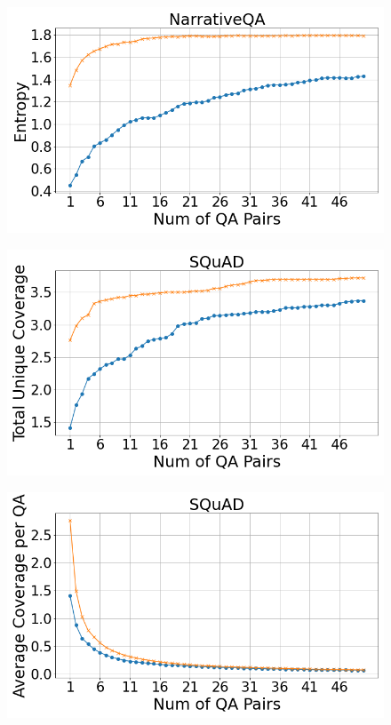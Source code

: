 \documentclass[11pt]{article}
\begin{document}
\begin{figure}[h!]
\begin{minipage}[h]{0.33\linewidth}
    \label{fig:narrativeqa-avg-cov-per-qa}
    \end{minipage}
    \begin{minipage}[h]{0.33\linewidth}
        \centering
        \includegraphics[width=\textwidth]{submissions/Tung2023/figs/NarrativeQA_Entropy.png}
    \label{fig:narrativeqa-entropy}
    \end{minipage}
    \begin{minipage}[h]{0.33\linewidth}
        \centering
        \includegraphics[width=\textwidth]{submissions/Tung2023/figs/Squad_Total Unique Coverage.png}
    \label{fig:squad-total-unique-coverage}
    \end{minipage}
    \begin{minipage}[h]{0.33\linewidth}
        \centering
        \includegraphics[width=\textwidth]{submissions/Tung2023/figs/Squad_Average Coverage per QA.png}

\end{minipage}
\end{figure}
\end{document}

